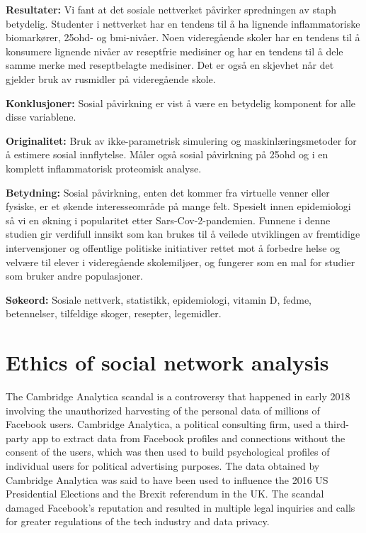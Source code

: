 \vspace{0.90\baselineskip}

\textbf{Resultater:} Vi fant at det sosiale nettverket påvirker spredningen av \gls{staph} betydelig. Studenter i nettverket har en tendens til å ha lignende inflammatoriske biomarkører, \gls{25ohd}- og \gls{bmi}-nivåer. Noen videregående skoler har en tendens til å konsumere lignende nivåer av reseptfrie medisiner og har en tendens til å dele samme merke med reseptbelagte medisiner. Det er også en skjevhet når det gjelder bruk av rusmidler på videregående skole.

\vspace{0.90\baselineskip}

\textbf{Konklusjoner:} Sosial påvirkning er vist å være en betydelig komponent for alle disse variablene.

\vspace{0.90\baselineskip}

\textbf{Originalitet:} Bruk av ikke-parametrisk simulering og maskinlæringsmetoder for å estimere sosial innflytelse. Måler også sosial påvirkning på \gls{25ohd} og i en komplett inflammatorisk proteomisk analyse.

\vspace{0.90\baselineskip}

\textbf{Betydning:} Sosial påvirkning, enten det kommer fra virtuelle venner eller fysiske, er et økende interesseområde på mange felt. Spesielt innen epidemiologi så vi en økning i popularitet etter Sars-Cov-2-pandemien. Funnene i denne studien gir verdifull innsikt som kan brukes til å veilede utviklingen av fremtidige intervensjoner og offentlige politiske initiativer rettet mot å forbedre helse og velvære til elever i videregående skolemiljøer, og fungerer som en mal for studier som bruker andre populasjoner.

\vspace{0.90\baselineskip}

\textbf{Søkeord:} Sosiale nettverk, statistikk, epidemiologi, vitamin D, fedme, betennelser, tilfeldige skoger, resepter, legemidler.



\section{Ethics of social network analysis}

The Cambridge Analytica scandal is a controversy that happened in early 2018 involving the unauthorized harvesting of the personal data of millions of Facebook users. Cambridge Analytica, a political consulting firm, used a third-party app to extract data from Facebook profiles and connections without the consent of the users, which was then used to build psychological profiles of individual users for political advertising purposes. The data obtained by Cambridge Analytica was said to have been used to influence the 2016 US Presidential Elections and the Brexit referendum in the UK. The scandal damaged Facebook's reputation and resulted in multiple legal inquiries and calls for greater regulations of the tech industry and data privacy.

